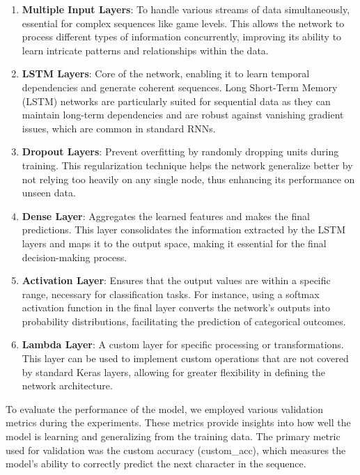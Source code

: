 \documentclass[runningheads]{llncs}
\begin{document}
\begin{enumerate}
\item \textbf{Multiple Input Layers}: To handle various streams of data simultaneously, essential for complex sequences like game levels. This allows the network to process different types of information concurrently, improving its ability to learn intricate patterns and relationships within the data.\\

\item \textbf{LSTM Layers}: Core of the network, enabling it to learn temporal dependencies and generate coherent sequences. Long Short-Term Memory (LSTM) networks are particularly suited for sequential data as they can maintain long-term dependencies and are robust against vanishing gradient issues, which are common in standard RNNs.\\

\item \textbf{Dropout Layers}: Prevent overfitting by randomly dropping units during training. This regularization technique helps the network generalize better by not relying too heavily on any single node, thus enhancing its performance on unseen data.\\

\item \textbf{Dense Layer}: Aggregates the learned features and makes the final predictions. This layer consolidates the information extracted by the LSTM layers and maps it to the output space, making it essential for the final decision-making process.\\

\item \textbf{Activation Layer}: Ensures that the output values are within a specific range, necessary for classification tasks. For instance, using a softmax activation function in the final layer converts the network's outputs into probability distributions, facilitating the prediction of categorical outcomes.\\

\item \textbf{Lambda Layer}: A custom layer for specific processing or transformations. This layer can be used to implement custom operations that are not covered by standard Keras layers, allowing for greater flexibility in defining the network architecture.\\
\end{enumerate}


To evaluate the performance of the model, we employed various validation metrics during the experiments. These metrics provide insights into how well the model is learning and generalizing from the training data. The primary metric used for validation was the custom accuracy (custom\_acc), which measures the model's ability to correctly predict the next character in the sequence.
\end{document}
